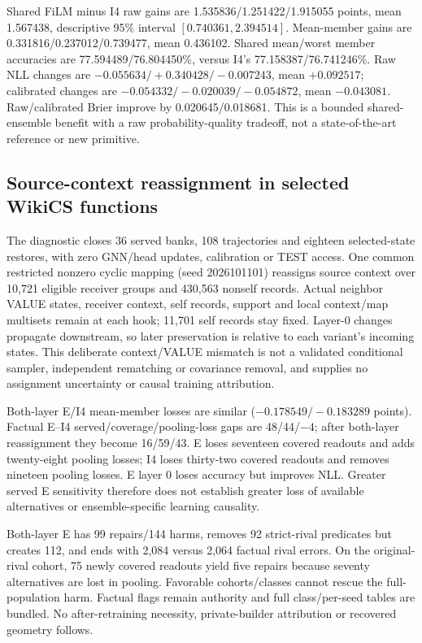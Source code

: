 Shared FiLM minus I4 raw gains are 1.535836/1.251422/1.915055 points, mean 1.567438, descriptive 95\% interval $[0.740361,2.394514]$. Mean-member gains are 0.331816/0.237012/0.739477, mean 0.436102. Shared mean/worst member accuracies are 77.594489/76.804450\%, versus I4's 77.158387/76.741246\%. Raw NLL changes are $-0.055634/+0.340428/-0.007243$, mean $+0.092517$; calibrated changes are $-0.054332/-0.020039/-0.054872$, mean $-0.043081$. Raw/calibrated Brier improve by 0.020645/0.018681. This is a bounded shared-ensemble benefit with a raw probability-quality tradeoff, not a state-of-the-art reference or new primitive.

\subsection{Source-context reassignment in selected WikiCS functions}\label{app:association-v5}
The diagnostic closes 36 served banks, 108 trajectories and eighteen selected-state restores, with zero GNN/head updates, calibration or TEST access. One common restricted nonzero cyclic mapping (seed 2026101101) reassigns source context over 10,721 eligible receiver groups and 430,563 nonself records. Actual neighbor VALUE states, receiver context, self records, support and local context/map multisets remain at each hook; 11,701 self records stay fixed. Layer-0 changes propagate downstream, so later preservation is relative to each variant's incoming states. This deliberate context/VALUE mismatch is not a validated conditional sampler, independent rematching or covariance removal, and supplies no assignment uncertainty or causal training attribution.



Both-layer E/I4 mean-member losses are similar ($-0.178549/-0.183289$ points). Factual E--I4 served/coverage/pooling-loss gaps are 48/44/$-4$; after both-layer reassignment they become 16/59/43. E loses seventeen covered readouts and adds twenty-eight pooling losses; I4 loses thirty-two covered readouts and removes nineteen pooling losses. E layer 0 loses accuracy but improves NLL. Greater served E sensitivity therefore does not establish greater loss of available alternatives or ensemble-specific learning causality.

Both-layer E has 99 repairs/144 harms, removes 92 strict-rival predicates but creates 112, and ends with 2,084 versus 2,064 factual rival errors. On the original-rival cohort, 75 newly covered readouts yield five repairs because seventy alternatives are lost in pooling. Favorable cohorts/classes cannot rescue the full-population harm. Factual flags remain authority and full class/per-seed tables are bundled. No after-retraining necessity, private-builder attribution or recovered geometry follows.

